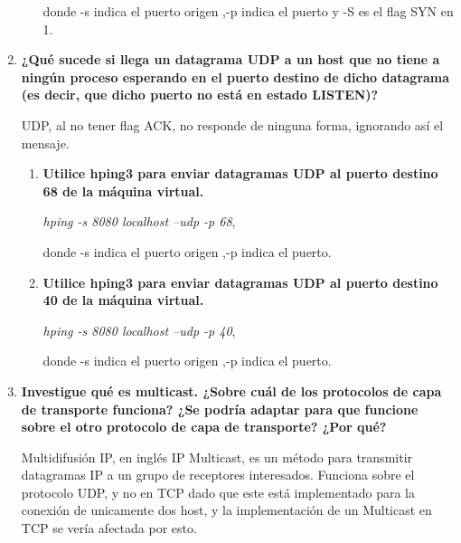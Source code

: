 \documentclass[a4paper,10pt]{article}
\begin{document}
\begin{enumerate}
\begin{enumerate}
            donde -s indica el puerto origen ,-p indica el puerto y -S es el flag SYN en 1.
        \end{enumerate}
    
    \item \textbf{¿Qué sucede si llega un datagrama UDP a un host que no tiene a ningún proceso esperando en el puerto destino de dicho datagrama (es decir, que dicho puerto no está en estado LISTEN)?}
    
    UDP, al no tener flag ACK, no responde de ninguna forma, ignorando así el mensaje.
    
    
        \begin{enumerate}
            \item \textbf{Utilice hping3 para enviar datagramas UDP al puerto destino 68 de la máquina virtual.}
            
            \textit{hping -s 8080 localhost --udp -p 68}, 
            
            donde -s indica el puerto origen ,-p indica el puerto.
            
            \item \textbf{Utilice hping3 para enviar datagramas UDP al puerto destino 40 de la máquina virtual.}
            
            \textit{hping -s 8080 localhost --udp -p 40}, 
            
            donde -s indica el puerto origen ,-p indica el puerto.
        \end{enumerate}
        
    \item \textbf{Investigue qué es multicast. ¿Sobre cuál de los protocolos de capa de transporte funciona? ¿Se podría adaptar para que funcione sobre el otro protocolo de capa de transporte? ¿Por qué?}
    
    Multidifusión IP, en inglés IP Multicast, es un método para transmitir datagramas IP a un grupo de receptores interesados.
    Funciona sobre el protocolo UDP, y no en TCP dado que este está implementado para la conexión de unicamente dos host, y la implementación de un Multicast en TCP se vería afectada por esto.
\end{enumerate}
\end{document}
